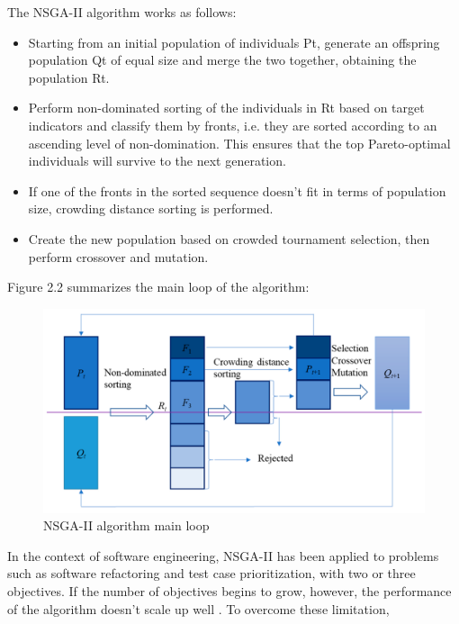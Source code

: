 The NSGA-II algorithm works as follows:
\begin{itemize}
    \item Starting from an initial population of individuals Pt, generate an offspring population Qt of equal size and merge the two together, obtaining the population Rt.
    \item Perform non-dominated sorting of the individuals in Rt based on target indicators and classify them by fronts, i.e. they are sorted according to an ascending level of non-domination.  This ensures that the top Pareto-optimal individuals will survive to the next generation.
    \item If one of the fronts in the sorted sequence doesn't fit in terms of population size, crowding distance sorting is performed.
    \item Create the new population based on crowded tournament selection, then perform crossover and mutation. 
\end{itemize}


Figure 2.2 summarizes the main loop of the algorithm:
\begin{figure}[h]
    \centering
    \includegraphics[scale=0.1]{./figures/nsga-ii.png}
    \caption{NSGA-II algorithm main loop}
    \label{fig:NSGA-II algorithm main loop}
\end{figure}


In the context of software engineering, NSGA-II has been applied to problems such as software refactoring and test case prioritization,
with two or three objectives. If the number of objectives begins to grow, however, the performance of the algorithm doesn't scale up well \cite{article3}.
To overcome these limitation,


